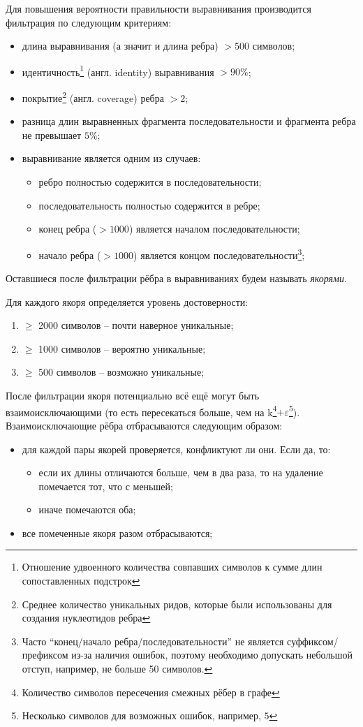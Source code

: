 \documentclass[14pt]{matmex-diploma-custom}
\begin{document}
Для повышения вероятности правильности выравнивания производится фильтрация по следующим критериям:
\begin{itemize}
    \item длина выравнивания (а значит и длина ребра) $> 500$ символов;
    \item идентичность\footnote{Отношение удвоенного количества совпавших символов к сумме длин сопоставленных подстрок} (англ. identity) выравнивания $> 90\%$;
    \item покрытие\footnote{Среднее количество уникальных ридов, которые были использованы для создания нуклеотидов ребра} (англ. coverage) ребра $> 2$;
    \item разница длин выравненных фрагмента последовательности и фрагмента ребра не превышает $5\%$;
    \item выравнивание является одним из случаев:
    \begin{itemize}
        \item ребро полностью содержится в последовательности;
        \item последовательность полностью содержится в ребре;
        \item конец ребра ($>1000$) является началом последовательности;
        \item начало ребра ($>1000$) является концом последовательности\footnote{Часто ``конец/начало ребра/последовательности'' не является суффиксом/префиксом из-за наличия ошибок, поэтому необходимо допускать небольшой отступ, например, не больше 50 символов.};
    \end{itemize}
\end{itemize}
Оставшиеся после фильтрации рёбра в выравниваниях будем называть \textit{якорями}. 

Для каждого якоря определяется уровень достоверности:
\begin{enumerate}
    \item $\ge$ 2000 символов -- почти наверное уникальные;
    \item $\ge$ 1000 символов -- вероятно уникальные;
    \item $\ge$ 500 символов -- возможно уникальные;
\end{enumerate}

После фильтрации якоря потенциально всё ещё могут быть взаимоисключающими (то есть пересекаться больше, чем на k\footnote{Количество символов пересечения смежных рёбер в графе}$+\varepsilon$\footnote{Несколько символов для возможных ошибок, например, $5$}). Взаимоисключающие рёбра отбрасываются следующим образом:
\begin{itemize}
    \item для каждой пары якорей проверяется, конфликтуют ли они. Если да, то:
    \begin{itemize}
        \item если их длины отличаются больше, чем в два раза, то на удаление помечается тот, что с меньшей;
        \item иначе помечаются оба;
    \end{itemize}
    \item все помеченные якоря разом отбрасываются;
\end{itemize}
\end{document}
